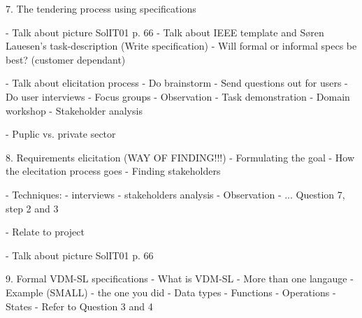 7. The tendering process using specifications

- Talk about picture SolIT01 p. 66
	- Talk about IEEE template and Søren Lauesen's task-description (Write specification)
		- Will formal or informal specs be best? (customer dependant)
	
- Talk about elicitation process
	- Do brainstorm
	- Send questions out for users
	- Do user interviews
	- Focus groups
	- Observation
	- Task demonstration
	- Domain workshop
	- Stakeholder analysis
	
- Puplic vs. private sector
		

	


8. Requirements elicitation (WAY OF FINDING!!!)
- Formulating the goal
	- How the elecitation process goes
	- Finding stakeholders

- Techniques:
	- interviews
	- stakeholders analysis
	- Observation
	- ... Question 7, step 2 and 3

- Relate to project

- Talk about picture SolIT01 p. 66


9. Formal VDM-SL specifications
- What is VDM-SL
- More than one langauge
- Example (SMALL) - the one you did
	- Data types
	- Functions
	- Operations
	- States
- Refer to Question 3 and 4



